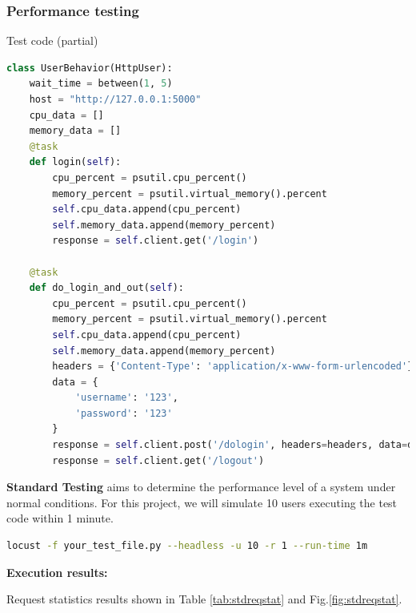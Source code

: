 \documentclass[journal]{IEEEtran}
\begin{document}
\subsubsection{Performance testing}
Test code (partial)
\begin{lstlisting}[caption={Test code (partial)},label={lst:testcode},language=python,breaklines=true]
class UserBehavior(HttpUser):
    wait_time = between(1, 5)
    host = "http://127.0.0.1:5000"
    cpu_data = []
    memory_data = []
    @task
    def login(self):
        cpu_percent = psutil.cpu_percent()
        memory_percent = psutil.virtual_memory().percent
        self.cpu_data.append(cpu_percent)
        self.memory_data.append(memory_percent)
        response = self.client.get('/login')

    @task
    def do_login_and_out(self):
        cpu_percent = psutil.cpu_percent()
        memory_percent = psutil.virtual_memory().percent
        self.cpu_data.append(cpu_percent)
        self.memory_data.append(memory_percent)
        headers = {'Content-Type': 'application/x-www-form-urlencoded'}
        data = {
            'username': '123',
            'password': '123'
        }
        response = self.client.post('/dologin', headers=headers, data=data)
        response = self.client.get('/logout')
  \end{lstlisting}

\textbf{Standard Testing} aims to determine the performance level of a system under normal conditions. For this project, we will simulate 10 users executing the test code within 1 minute. 
\begin{lstlisting}[label={lst:locustcmd1},language=BASH,breaklines=true]
locust -f your_test_file.py --headless -u 10 -r 1 --run-time 1m
\end{lstlisting}

\textbf{Execution results:}

Request statistics results shown in Table \ref{tab:stdreqstat} and Fig.\ref{fig:stdreqstat}.







\end{document}
